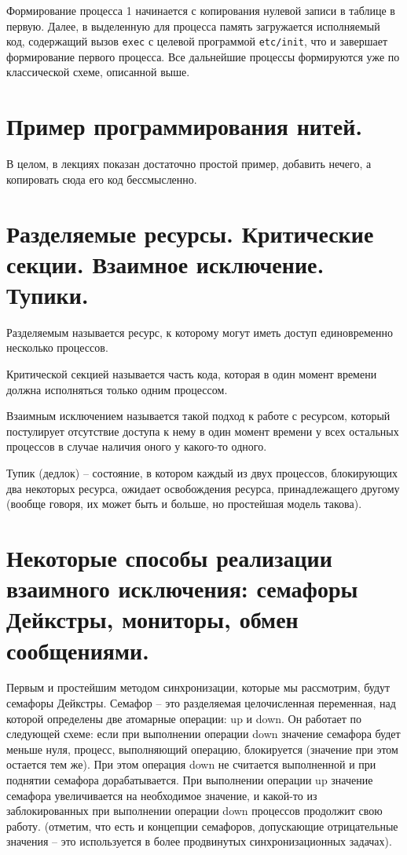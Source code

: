 \documentclass[a4paper,12pt,titlepage,finall]{article}
\begin{document}
Формирование процесса 1 начинается с копирования нулевой записи в таблице в первую. Далее, в выделенную для процесса память загружается исполняемый код, содержащий вызов \texttt{exec} с целевой программой \texttt{etc/init}, что и завершает формирование первого процесса. Все дальнейшие процессы формируются уже по классической схеме, описанной выше.

\section{Пример программирования нитей.}
В целом, в лекциях показан достаточно простой пример, добавить нечего, а копировать сюда его код бессмысленно.

\section{Разделяемые ресурсы. Критические секции. Взаимное исключение.
Тупики.}
Разделяемым называется ресурс, к которому могут иметь доступ единовременно несколько процессов.

Критической секцией называется часть кода, которая в один момент времени должна исполняться только одним процессом.

Взаимным исключением называется такой подход к работе с ресурсом, который постулирует отсутствие доступа к нему в один момент времени у всех остальных процессов в случае наличия оного у какого-то одного.

Тупик (дедлок) -- состояние, в котором каждый из двух процессов, блокирующих два некоторых ресурса, ожидает освобождения ресурса, принадлежащего другому (вообще говоря, их может быть и больше, но простейшая модель такова).

\section{Некоторые способы реализации взаимного исключения: семафоры
Дейкстры, мониторы, обмен сообщениями.}
Первым и простейшим методом синхронизации, которые мы рассмотрим, будут семафоры Дейкстры. Семафор -- это разделяемая целочисленная переменная, над которой определены две атомарные операции: up и down. Он работает по следующей схеме: если при выполнении операции down значение семафора будет меньше нуля, процесс, выполняющий операцию, блокируется (значение при этом остается тем же). При этом операция down не считается выполненной и при поднятии семафора дорабатывается. При выполнении операции up значение семафора увеличивается на необходимое значение, и какой-то из заблокированных при выполнении операции down процессов продолжит свою работу. (отметим, что есть и концепции семафоров, допускающие отрицательные значения -- это используется в более продвинутых синхронизационных задачах).
\end{document}
